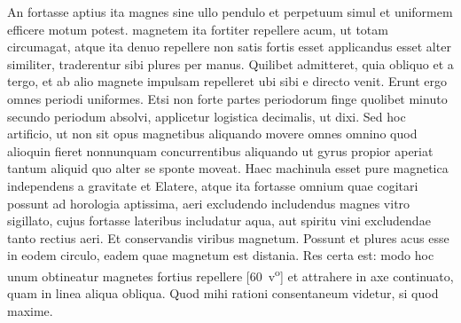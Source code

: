 {An fortasse aptius ita magnes}{} sine ullo pendulo\protect{} et perpetuum simul et uniformem efficere motum\protect{}\protect{} potest.  magnetem\protect{} ita fortiter repellere  acum, ut totam circumagat, atque ita denuo repellere  non satis fortis  esset applicandus esset alter similiter, traderentur sibi  plures per manus. Quilibet admitteret, quia   obliquo et a tergo, et ab alio magnete\protect{} impulsam\protect{}  repelleret ubi sibi e directo venit. Erunt ergo  omnes periodi uniformes. Etsi non forte partes periodorum  finge quolibet minuto secundo periodum absolvi,  applicetur logistica decimalis, ut dixi. Sed  hoc artificio, ut non sit opus magnetibus\protect{} aliquando movere  omnes omnino  quod alioquin fieret nonnunquam concurrentibus aliquando  ut gyrus propior aperiat tantum aliquid quo alter  se sponte moveat. Haec machinula\protect{} esset pure magnetica independens a gravitate\protect{} et Elatere\protect{}, atque  ita fortasse omnium quae cogitari possunt ad horologia\protect{}  aptissima, aeri excludendo includendus magnes\protect{} vitro  sigillato, cujus fortasse lateribus includatur aqua, aut spiritu vini\protect{} excludendae tanto rectius aeri. Et conservandis  viribus magnetum\protect{}. Possunt et plures acus esse in  eodem circulo, eadem quae magnetum\protect{} est distania. Res  certa est: modo hoc unum obtineatur magnetes\protect{} fortius repellere [60~v\textsuperscript{o}] et attrahere in axe continuato, quam in linea  aliqua obliqua. Quod mihi rationi consentaneum videtur, si quod maxime. 
